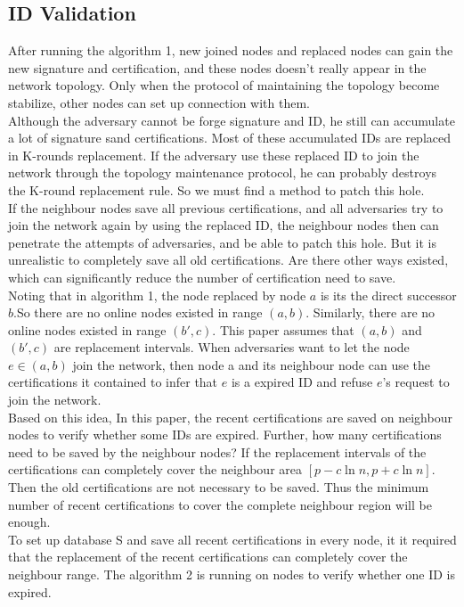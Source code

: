 \documentclass[10pt]{article}
\begin{document}
\subsection{ID Validation}
After running the algorithm 1, new joined nodes and replaced nodes can gain the new signature and certification,  and these nodes doesn't really appear in the network topology. Only when the protocol of maintaining the topology become stabilize, other nodes can set up connection with them.\\
Although the adversary cannot be forge signature and ID, he still can accumulate a lot of signature sand certifications. Most of these accumulated IDs are replaced in K-rounds replacement.   If the adversary use these replaced ID to join the network through the topology maintenance protocol, he can probably destroys the K-round replacement rule. So we must find a method to patch this hole.\\
If the neighbour nodes save all previous certifications, and all adversaries try to join the network again by using the replaced ID, the neighbour nodes then can penetrate the attempts of adversaries, and be able to patch this hole. But it is unrealistic to completely save all old certifications. Are there other ways existed, which can significantly reduce the number of certification need to save. \\
Noting that in algorithm 1, the node replaced by node $a$ is its the direct successor $b$.So there are no online nodes existed in range $(a,b)$. Similarly, there are no online nodes existed in range $(b',c)$. This paper assumes that $(a,b)$ and $(b',c)$ are replacement intervals. When adversaries want to let the node $e\in(a,b)$ join the network, then node a and its neighbour node can use the certifications it contained to infer that $e$ is a expired ID and refuse $e$'s request to join the network.\\
Based on this idea, In this paper, the recent certifications are saved on neighbour nodes to verify whether some IDs are expired. Further, how many certifications need to be saved by the neighbour nodes? If the replacement intervals of the certifications can completely cover the neighbour area $[p-c\ln{n},p+c\ln{n}]$. Then the old certifications are not necessary to be saved. Thus the minimum number of recent certifications to cover the complete neighbour region will be enough.\\
To set up database S and save all recent certifications in every node, it it required that the replacement of the recent certifications can completely cover the neighbour range.  The algorithm 2 is running on nodes to verify whether one ID is expired.\\
\end{document}
